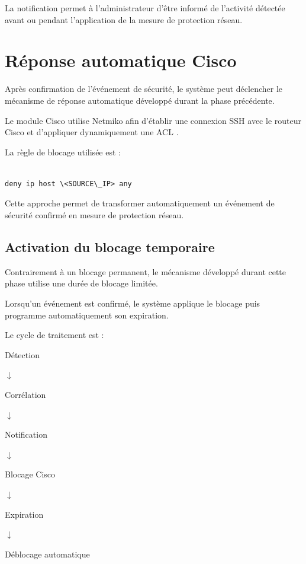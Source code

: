La notification permet à l'administrateur d'être informé de l'activité détectée avant ou pendant l'application de la mesure de protection réseau.

\section{Réponse automatique Cisco}

Après confirmation de l'événement de sécurité, le système peut déclencher le mécanisme de réponse automatique développé durant la phase précédente.

Le module Cisco utilise Netmiko afin d'établir une connexion SSH avec le routeur Cisco et d'appliquer dynamiquement une ACL \cite{netmiko_docs,cisco_ios}.

La règle de blocage utilisée est :

\begin{verbatim}

deny ip host \<SOURCE\_IP> any

\end{verbatim}

Cette approche permet de transformer automatiquement un événement de sécurité confirmé en mesure de protection réseau.

\subsection{Activation du blocage temporaire}

Contrairement à un blocage permanent, le mécanisme développé durant cette phase utilise une durée de blocage limitée.

Lorsqu'un événement est confirmé, le système applique le blocage puis programme automatiquement son expiration.

Le cycle de traitement est :

\begin{center}

Détection

$\downarrow$

Corrélation

$\downarrow$

Notification

$\downarrow$

Blocage Cisco

$\downarrow$

Expiration

$\downarrow$

Déblocage automatique

\end{center}

